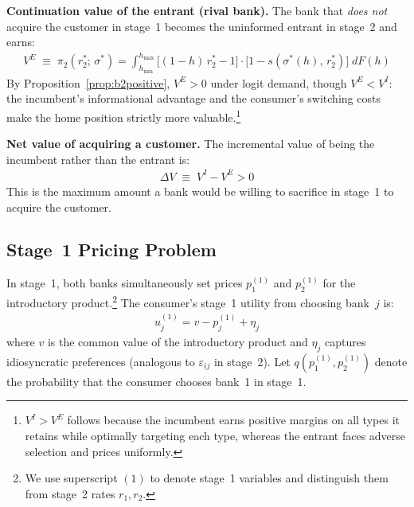 \documentclass[12pt]{article}
\theoremstyle{plain}
\theoremstyle{plain}
\theoremstyle{definition}  %
\theoremstyle{remark}  %
\begin{document}
\medskip\noindent
\textbf{Continuation value of the entrant (rival bank).} The bank that \emph{does not} acquire the customer in stage~1 becomes the uninformed entrant in stage~2 and earns:
\begin{align}\label{eq:V_E}
    V^{E} \;\equiv\; \pi_2(r_2^*;\, \sigma^*) = \int_{h_{\min}}^{h_{\max}} \big[(1-h)\,r_2^* - 1\big] \cdot \big[1 - s(\sigma^*(h),\, r_2^*)\big] \; dF(h)
\end{align}
By Proposition~\ref{prop:b2positive}, $V^E > 0$ under logit demand, though $V^E < V^I$: the incumbent's informational advantage and the consumer's switching costs make the home position strictly more valuable.\footnote{$V^I > V^E$ follows because the incumbent earns positive margins on all types it retains while optimally targeting each type, whereas the entrant faces adverse selection and prices uniformly.}

\medskip\noindent
\textbf{Net value of acquiring a customer.} The incremental value of being the incumbent rather than the entrant is:
\begin{align}\label{eq:DeltaV}
    \Delta V \;\equiv\; V^I - V^E > 0
\end{align}
This is the maximum amount a bank would be willing to sacrifice in stage~1 to acquire the customer.

\subsection{Stage~1 Pricing Problem}

In stage~1, both banks simultaneously set prices $p_1^{(1)}$ and $p_2^{(1)}$ for the introductory product.\footnote{We use superscript $(1)$ to denote stage~1 variables and distinguish them from stage~2 rates $r_1, r_2$.} The consumer's stage~1 utility from choosing bank~$j$ is:
\begin{align}\label{eq:u_stage1}
    u_j^{(1)} = v - p_j^{(1)} + \eta_j
\end{align}
where $v$ is the common value of the introductory product and $\eta_j$ captures idiosyncratic preferences (analogous to $\varepsilon_{ij}$ in stage~2). Let $q(p_1^{(1)}, p_2^{(1)})$ denote the probability that the consumer chooses bank~1 in stage~1.
\end{document}
